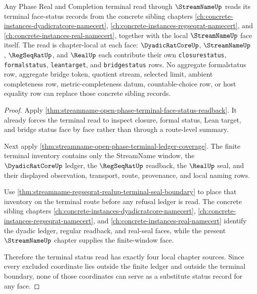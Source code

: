 \begin{theorem}
\label{thm:streamname-open-phase-terminal-status-sibling-readback}
Any Phase Real and Completion terminal read through $\StreamNameUp$ reads its terminal face-status records from the concrete sibling chapters \autoref{ch:concrete-instances-dyadicratcore-namecert}, \autoref{ch:concrete-instances-regseqrat-namecert}, and \autoref{ch:concrete-instances-real-namecert}, together with the local $\StreamNameUp$ face itself. The read is chapter-local at each face: $\DyadicRatCoreUp$, $\StreamNameUp$, $\RegSeqRatUp$, and $\RealUp$ each contribute their own \texttt{closurestatus}, \texttt{formalstatus}, \texttt{leantarget}, and \texttt{bridgestatus} rows. No aggregate formalstatus row, aggregate bridge token, quotient stream, selected limit, ambient completeness row, metric-completeness datum, countable-choice row, or host equality row can replace those concrete sibling records.
\end{theorem}
\begin{proof}
Apply \autoref{thm:streamname-open-phase-terminal-face-status-readback}. It already forces the terminal read to inspect closure, formal status, Lean target, and bridge status face by face rather than through a route-level summary.

Next apply \autoref{thm:streamname-open-phase-terminal-ledger-coverage}. The finite terminal inventory contains only the StreamName window, the $\DyadicRatCoreUp$ ledger, the $\RegSeqRatUp$ readback, the $\RealUp$ seal, and their displayed observation, transport, route, provenance, and local naming rows.

Use \autoref{thm:streamname-regseqrat-realup-terminal-seal-boundary} to place that inventory on the terminal route before any refusal ledger is read. The concrete sibling chapters \autoref{ch:concrete-instances-dyadicratcore-namecert}, \autoref{ch:concrete-instances-regseqrat-namecert}, and \autoref{ch:concrete-instances-real-namecert} identify the dyadic ledger, regular readback, and real-seal faces, while the present $\StreamNameUp$ chapter supplies the finite-window face.

Therefore the terminal status read has exactly four local chapter sources. Since every excluded coordinate lies outside the finite ledger and outside the terminal boundary, none of those coordinates can serve as a substitute status record for any face.
\end{proof}

